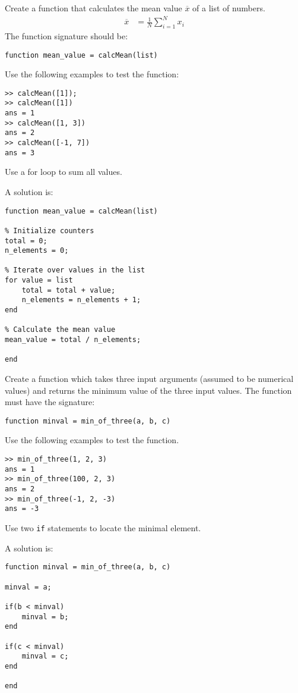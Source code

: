 \begin{ex}
\label{exCalcMean}%
Create a function that calculates the mean value $\overline{x}$ of a list of numbers.
\begin{align}
\overline{x}
	& = \frac{1}{N} \sum_{i = 1}^{N} x_i
\end{align}
The function signature should be:
\begin{lstlisting}
function mean_value = calcMean(list)
\end{lstlisting}
Use the following examples to test the function:
\begin{lstlisting}
>> calcMean([1]);
>> calcMean([1])
ans = 1
>> calcMean([1, 3])
ans = 2
>> calcMean([-1, 7])
ans = 3
\end{lstlisting}
\begin{hint}
Use a for loop to sum all values.
\end{hint}
\begin{sol}
A solution is:
\begin{lstlisting}
function mean_value = calcMean(list)

% Initialize counters
total = 0;
n_elements = 0;

% Iterate over values in the list
for value = list
    total = total + value;
    n_elements = n_elements + 1;
end

% Calculate the mean value
mean_value = total / n_elements;

end
\end{lstlisting}
\end{sol}
\end{ex}




\begin{ex}
\label{exMinOfThree}%
Create a function which takes three input arguments
(assumed to be numerical values) and returns the 
minimum value of the three input values.
The function must have the signature:
\begin{lstlisting}
function minval = min_of_three(a, b, c)
\end{lstlisting}
Use the following examples to test the function.
\begin{lstlisting}
>> min_of_three(1, 2, 3)
ans = 1
>> min_of_three(100, 2, 3)
ans = 2
>> min_of_three(-1, 2, -3)
ans = -3
\end{lstlisting}
\begin{hint}
Use two \verb!if! statements to locate the minimal element.
\end{hint}
\begin{sol}
A solution is:
\begin{lstlisting}
function minval = min_of_three(a, b, c)

minval = a;

if(b < minval)
    minval = b;
end

if(c < minval)
    minval = c;
end

end
\end{lstlisting}
\end{sol}
\end{ex}

